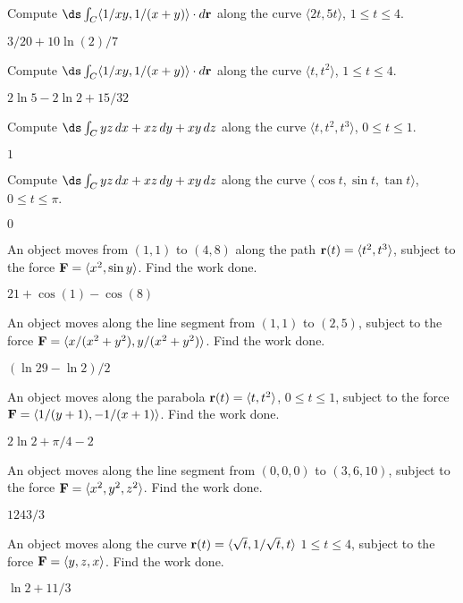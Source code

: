 \begin{exercises}
\exercise Compute $\ds\int_C \langle 1/xy,1/(x+y)\rangle\cdot
d{\bf r}$ along the 
curve $\langle 2t,5t\rangle$, $1\le t\le 4$.
\begin{answer} $3/20+10\ln(2)/7$
\end{answer}

\exercise Compute $\ds\int_C \langle 1/xy,1/(x+y)\rangle\cdot 
d{\bf r}$ along the 
curve $\langle t,t^2\rangle$, $1\le t\le 4$.
\begin{answer} $2\ln5-2\ln2+15/32$
\end{answer}

\exercise Compute $\ds\int_C yz\,dx+xz\,dy+xy\,dz$ along the curve
$\langle t,t^2,t^3\rangle$, $0\le t\le1$.
\begin{answer} $1$
\end{answer}

\exercise Compute $\ds\int_C yz\,dx+xz\,dy+xy\,dz$ along the curve
$\langle \cos t,\sin t,\tan t\rangle$, $0\le t\le\pi$.
\begin{answer} $0$
\end{answer}

\exercise An object moves from $(1,1)$ to
$(4,8)$ along the path ${\bf r}(t)=\langle t^2,t^3\rangle$,
subject to the force ${\bf F}=\langle x^2,\sin y\rangle$. Find the work
done. 
\begin{answer} $21+\cos(1)-\cos(8)$
\end{answer}

\exercise An object moves along the line segment from $(1,1)$ to $(2,5)$,
subject to the force ${\bf F}=\langle
x/(x^2+y^2),y/(x^2+y^2)\rangle$. Find the work done.
\begin{answer} $(\ln29-\ln2)/2$
\end{answer}

\exercise An object moves along the parabola ${\bf r}(t)=\langle
t,t^2\rangle$, $0\le t\le1$, subject to the force ${\bf F}=\langle
1/(y+1),-1/(x+1)\rangle$. Find the work done.
\begin{answer} $2\ln2+\pi/4-2$
\end{answer}

\exercise An object moves along the line segment from $(0,0,0)$ to
$(3,6,10)$,
subject to the force ${\bf F}=\langle x^2,y^2,z^2\rangle$. 
Find the work
done. 
\begin{answer} $1243/3$
\end{answer}

\exercise An object moves along the curve ${\bf r}(t)=\langle
\sqrt{t},1/\sqrt{t},t\rangle$ $1\le t\le4$, subject to the force ${\bf
  F}=\langle y,z,x\rangle$.  Find the work done.
\begin{answer} $\ln2+11/3$
\end{answer}


\end{exercises}
